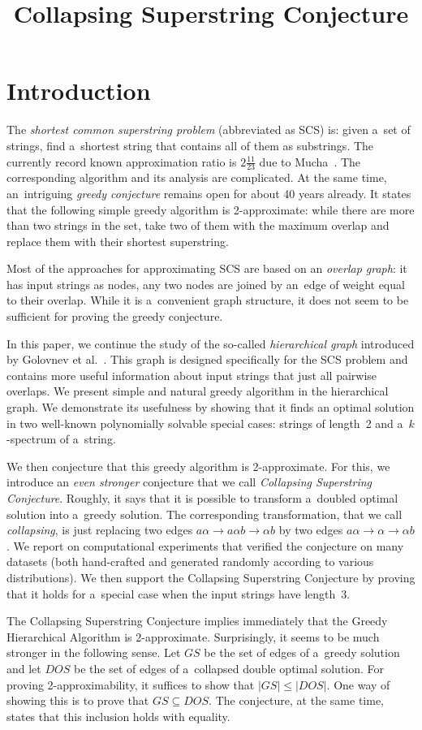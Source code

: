 \documentclass[11pt,letterpaper]{article}
\begin{document}
\sloppy
\author{}
\title{Collapsing Superstring Conjecture}
\maketitle

\section{Introduction}
The {\em shortest common superstring problem} (abbreviated as SCS) is:
given a~set of strings, find a~shortest string that contains all of them as
substrings. The currently record known approximation ratio is 
$2\frac{11}{23}$ due to Mucha~\cite{}.
The corresponding algorithm and its analysis are complicated.
At the same time, an~intriguing {\em greedy conjecture} remains open
for about 40 years already. It states that the following simple 
greedy algorithm is 2-approximate: while there are more than two strings 
in the set, take two of them with the maximum overlap and replace them
with their shortest superstring.

Most of the approaches for approximating SCS are based on an
{\em overlap graph}: it has input strings as nodes, any two nodes 
are joined by an~edge of weight equal to their overlap.  
While it is a~convenient graph structure, it does not seem to be sufficient
for proving the greedy conjecture.

In this paper, we continue the study of the so-called {\em hierarchical graph}
introduced by Golovnev et al.~\cite{}. This graph is designed specifically 
for the SCS problem and contains more useful information about input strings
that just all pairwise overlaps. We present simple and natural greedy algorithm
in the hierarchical graph. 
We demonstrate its usefulness by showing that it finds an optimal solution 
in two well-known polynomially solvable special cases: strings of length~2 and
a~$k$-spectrum of a~string.

We then conjecture that this greedy algorithm is 2-approximate. For this, we introduce an {\em even stronger} conjecture that we call 
{\em Collapsing Superstring Conjecture}. 
Roughly, it says that it is possible to transform a~doubled optimal 
solution into a~greedy solution. 
The corresponding transformation, that we call {\em collapsing}, 
is just replacing two edges $a\alpha \to a\alpha b \to \alpha b$ 
by two edges $a\alpha \to \alpha \to \alpha b$. 
We report on computational experiments that verified the 
conjecture on many datasets (both hand-crafted and generated randomly
according to various distributions). 
We then support the Collapsing Superstring Conjecture by 
proving that it holds for a~special case when the input strings have length~3.

The Collapsing Superstring Conjecture implies immediately that the Greedy Hierarchical Algorithm is 2-approximate. Surprisingly, it seems to be much stronger in the following sense. Let $GS$ be the set of edges of a~greedy solution and let $DOS$ be the set of edges of a~collapsed double optimal solution. For proving 2-approximability, it suffices to show that $|GS| \le |DOS|$. One way of showing this is to prove that $GS \subseteq DOS$. The conjecture, at the same time, states that this inclusion holds with equality.
\end{document}
